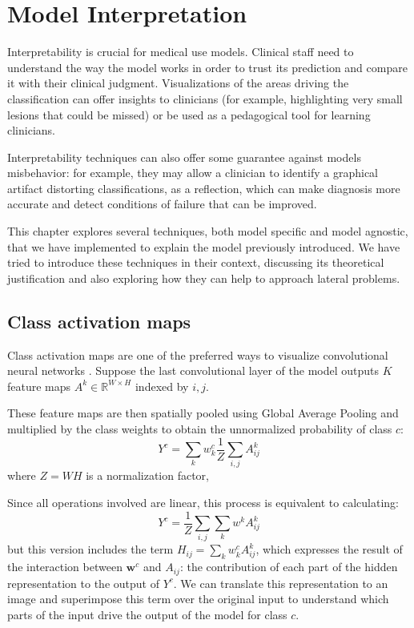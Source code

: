 \chapter{Model Interpretation} \label{chapter7}
Interpretability is crucial for medical use models. Clinical staff need to understand the way the model works in order to trust its prediction and compare it with their clinical judgment. Visualizations of the areas driving the classification can offer insights to clinicians (for example, highlighting very small lesions that could be missed) or be used as a pedagogical tool for learning clinicians. 

Interpretability techniques can also offer some guarantee against models misbehavior: for example, they may allow a clinician to identify a graphical artifact distorting classifications, as a reflection, which can make diagnosis more accurate and detect conditions of failure that can be improved. 

This chapter explores several techniques, both model specific and model agnostic, that we have implemented to explain the model previously introduced. We have tried to introduce these techniques in their context, discussing its theoretical justification and also exploring how they can help to approach lateral problems.

\section{Class activation maps}
Class activation maps are one of the preferred ways to visualize convolutional neural networks \cite{selvaraju2020grad-cam, jung2021explanations, bolei2016learning}. Suppose the last convolutional layer of the model outputs \( K \) feature maps \( A^k \in \mathbb{R}^{W \times H} \) indexed by \( i,j \).

These feature maps are then spatially pooled using Global Average Pooling and multiplied by the class weights to obtain the unnormalized probability of class \( c \):
\[
    Y^c = \sum_k w_k^c \frac{1}{Z} \sum_{i, j} A^k_{ij}
\]
where \( Z = WH \) is a normalization factor,

Since all operations involved are linear, this process is equivalent to calculating:
\[ 
    Y^c = \frac{1}{Z} \sum_{i, j} \sum_{k} w^k A^k_{ij} 
\]
but this version  includes the term \( H_{ij} = \sum_{k} w^c_k A^k_{ij} \), which expresses the result of the interaction between \( \bm{w}^c \) and \( A_{ij} \): the contribution of each part of the hidden representation to the output of \( Y^c \). We can translate this representation to an image and superimpose this term over the original input to understand which parts of the input drive the output of the model for class \( c \).

